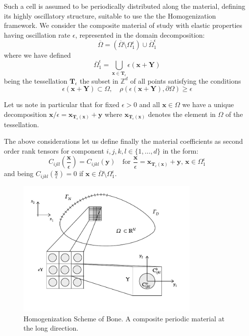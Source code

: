 Such a cell is assumed to be periodically distributed along the material, defining its highly oscillatory structure, suitable to use the the Homogenization framework. We consider the composite material of study with elastic properties having oscillation rate $\epsilon$, represented in the domain decomposition:
\begin{equation*}
	\overline{\Omega} = (\overline{\Omega}\setminus \Omega_1^{\epsilon}) \cup \overline{\Omega}^{\epsilon}_1
\end{equation*}
where we have defined
\begin{equation*}
    \overline{\Omega}^{\epsilon}_1 = \bigcup_{\mathbf{x} \in \mathbf{T}_{\epsilon}} \epsilon ( \mathbf{x} + \mathbf{Y} )
\end{equation*}
being the tessellation $\mathbf{T}_{\epsilon}$ the subset in $\mathbb{Z}^d$ of all points satisfying the conditions
\begin{equation*}
    \epsilon (\mathbf{x} + \mathbf{Y}) \subset \Omega, \quad \rho(\epsilon(\mathbf{x}+\mathbf{Y}), \partial \Omega) \geq \epsilon
\end{equation*}

Let us note in particular that for fixed $\epsilon >0$ and all $\mathbf{x} \in \Omega$ we have a unique decomposition $\mathbf{x}/\epsilon = \mathbf{x}_{\mathbf{T}_{\epsilon}(\mathbf{x})} + \mathbf{y}$ where $\mathbf{x}_{\mathbf{T}_{\epsilon}(\mathbf{x})}$ denotes the element in $\Omega$ of the tessellation.

The above considerations let us define finally the material coefficients as second order rank tensors for component $i,j,k,l \in \{1,\dots, d\}$ in the form:
\begin{equation*}
    C_{ijll}(\frac{\mathbf{x}}{\epsilon}) = C_{ijkl}(\mathbf{y}) \quad \text{for } \frac{\mathbf{x}}{\epsilon} = \mathbf{x}_{\mathbf{T}_{\epsilon}(\mathbf{x})} + \mathbf{y}, \, \mathbf{x} \in \Omega_1^{\epsilon}
\end{equation*}
and being $C_{ijkl}(\frac{\mathbf{x}}{\epsilon}) = 0$ if $\mathbf{x} \in \overline{\Omega} \setminus \Omega_1^{\epsilon}$.

\begin{figure}[!h]
	\centering
	\includegraphics[width=0.8\textwidth]{images/HomSchemes/HomBasicScheme.pdf}
	\caption{Homogenization Scheme of Bone. A composite periodic material at the long direction.}
	\label{HomBasicScheme}
\end{figure}

